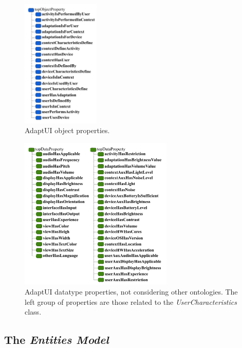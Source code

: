 \begin{figure}
\centering
\includegraphics[width=0.33\textwidth]{../figures/PDF/object_properties.pdf}
\caption{AdaptUI object properties.}
\label{fig:object_properties}
\end{figure}

\begin{figure}
\centering
\includegraphics[width=0.65\textwidth]{../figures/PDF/datatype_properties.pdf}
\caption{AdaptUI datatype properties, not considering other ontologies. The left
group of properties are those related to
the \textit{UserCharacteristics} class.}
\label{fig:datatype_properties}
\end{figure}


\subsection{The \textit{Entities Model}}
\label{sec:entities_model}


